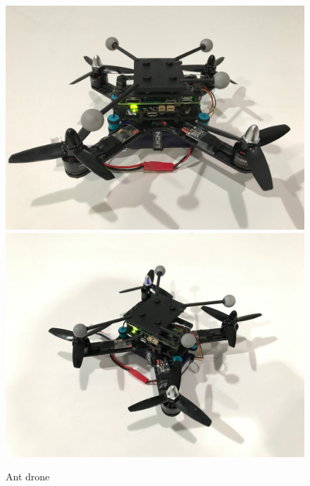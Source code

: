 \begin{figure}[!htb]
  \includegraphics[width=\linewidth]{chapters/chapter-02/figures/ant1_1.jpg}
\endminipage\hfill
{}
  \includegraphics[width=\linewidth]{chapters/chapter-02/figures/ant1_2.jpg}
\endminipage
\caption{Ant drone}
\label{fig:ant1}
\end{figure}

